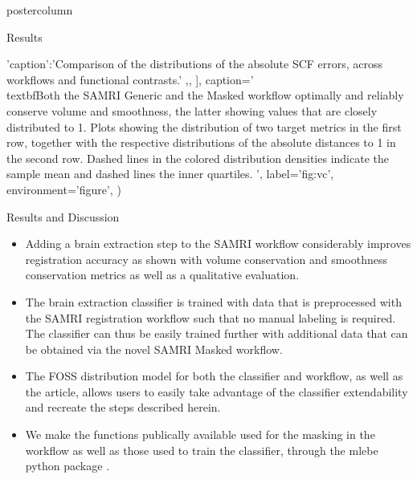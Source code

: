 \begin{frame}
\begin{columns}
\begin{column}{.59\textwidth}
\begin{beamercolorbox}[center]{postercolumn}
\begin{minipage}{.98\textwidth}
{\begin{myblock}{Results}
\begin{sansmath}
{{                                        'caption':'Comparison of the distributions of the absolute SCF errors, across workflows and functional contrasts.'
                                        ,},
                                        ],
                                        caption='\\textbf{Both the SAMRI Generic and the Masked workflow optimally and reliably conserve volume and smoothness, the latter showing values that are closely distributed to 1.}
                                        Plots showing the distribution of two target metrics in the first row, together with the respective distributions of the absolute distances to 1 in the second row. Dashed lines in the colored distribution densities indicate the sample mean and dashed lines the inner quartiles.
                                        ',
                                        label='fig:vc',
                                        environment='figure',
                                        )}
                                \end{sansmath}
                            \end{myblock}

                            \begin{myblock}{Results and Discussion}
                                \begin{itemize}
                                    \item Adding a brain extraction step to the SAMRI workflow considerably improves registration accuracy as shown with volume conservation and smoothness conservation metrics as well as a qualitative evaluation.
                                    \item The brain extraction classifier is trained with data that is preprocessed with the SAMRI registration workflow such that no manual labeling is required.
                                    The classifier can thus be easily trained further with additional data that can be obtained via the novel SAMRI Masked workflow.
                                    \item The FOSS distribution model \cite{repsep} for both the classifier and workflow, as well as the article, allows users to easily take advantage of the classifier extendability and recreate the steps described herein.
                                    \item We make the functions publically available used for the masking in the workflow as well as those used to train the classifier, through the \textcolor{mg}{mlebe} python package \cite{mlebe}.


\end{itemize}
\end{myblock}}
\end{minipage}
\end{beamercolorbox}
\end{column}
\end{columns}
\end{frame}

